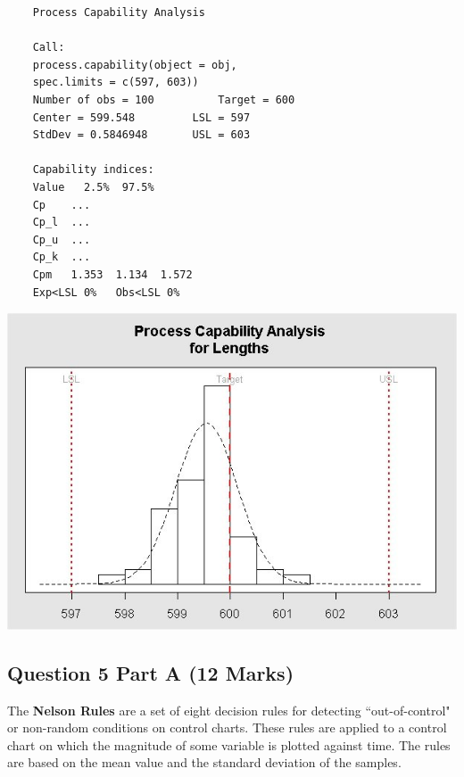 \documentclass[a4paper,12pt]{article}
\begin{document}
\newpage
\begin{framed}
	\begin{verbatim}
	Process Capability Analysis
	
	Call:
	process.capability(object = obj,  
	spec.limits = c(597, 603))
	Number of obs = 100          Target = 600
	Center = 599.548         LSL = 597
	StdDev = 0.5846948       USL = 603
	
	Capability indices:
	Value   2.5%  97.5%
	Cp    ...
	Cp_l  ...
	Cp_u  ...
	Cp_k  ...
	Cpm   1.353  1.134  1.572
	Exp<LSL 0%   Obs<LSL 0%
	\end{verbatim}
\end{framed}



\begin{center}
	\includegraphics[scale=0.55]{images/ExamQ4hist}
\end{center}
\newpage
%
%
%



\subsection*{Question 5 Part A (12 Marks)}
The \textbf{Nelson Rules} are a set of eight decision rules for detecting ``out-of-control" or non-random conditions on control charts. These rules are applied to a control chart on which the magnitude of some variable is plotted against time. The rules are based on the mean value and the standard deviation of the samples.\\
\end{document}
